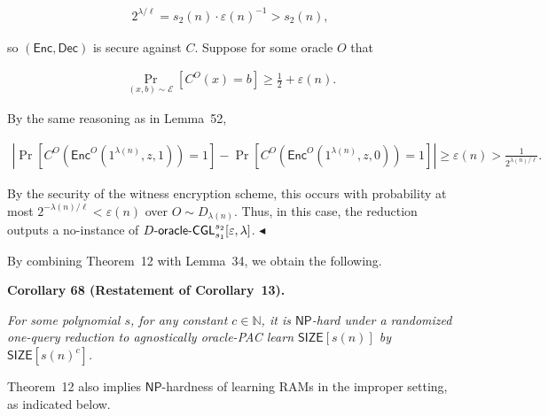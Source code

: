 \[\begin{gathered}
2^{\lambda/\ell}=s_{2}(n)\cdot\varepsilon(n)^{-1}>s_{2}(n),
\end{gathered}\]


so $({\mathsf{Enc}},{\mathsf{Dec}})$ is secure against $C$. Suppose for some oracle $O$ that\par


\[\begin{gathered}
\Pr_{(x,b)\sim\mathcal{E}}[C^{O}(x)=b]\geq\frac{1}{2}+\varepsilon(n).
\end{gathered}\]


By the same reasoning as in Lemma 52,\par


\[\begin{gathered}
\left|\Pr[C^{O}({\mathsf{Enc}}^{O}(1^{\lambda(n)},z,1))=1]-\Pr[C^{O}({\mathsf{Enc}}^{O}(1^{\lambda(n)},z,0))=1]\right|\geq\varepsilon(n)>\frac{1}{2^{\lambda(n)/\ell}}.
\end{gathered}\]


By the security of the witness encryption scheme, this occurs with probability at most $2^{-\lambda(n)/\ell}<\varepsilon(n)$ over $O\sim D_{\lambda(n)}$. Thus, in this case, the reduction outputs a no-instance of $D\text{-}{\sf oracle}\text{-}{\sf CGL}^{s_{2}}_{s_{1}}[\varepsilon,\lambda]$.
$\blacktriangleleft$\par




By combining Theorem 12 with Lemma 34, we obtain the following.\par





\par\medskip\noindent\textbf{
\textbf{Corollary 68}\textbf{ }(Restatement of Corollary 13)\textbf{.}
}\par



\emph{For some polynomial $s$, for any constant $c\in\mathbb{N}$, it is ${\mathsf{NP}}$-hard under a randomized one-query reduction to agnostically oracle-PAC learn ${\mathsf{SIZE}}[s(n)]$ by ${\mathsf{SIZE}}[s(n)^{c}]$.}\par






Theorem 12 also implies ${\mathsf{NP}}$-hardness of learning RAMs in the improper setting, as indicated below.\par



